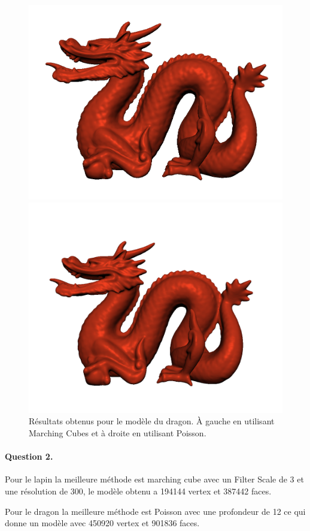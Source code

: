 \documentclass[french]{article}
\begin{document}
\begin{figure}[h]
	\centering
	\begin{minipage}{0.47\linewidth}
		\centering
		\includegraphics[width=\linewidth]{dragonrimls00.png}
	\end{minipage}\hfill
	\begin{minipage}{0.47\linewidth}
		\centering
		\includegraphics[width=\linewidth]{dragonpoisson00.png}
	\end{minipage}
	\caption{Résultats obtenus pour le modèle du dragon. À gauche en utilisant Marching Cubes et à droite en utilisant Poisson.}
	\label{fig:meshdragon}
\end{figure}

\paragraph{Question 2.}
Pour le lapin la  meilleure méthode est marching cube avec un Filter Scale de 3 et une résolution de 300, le modèle obtenu a 194144 vertex et  387442 faces.

Pour le dragon la meilleure méthode est Poisson avec une profondeur de 12 ce qui donne un modèle avec 450920 vertex et 901836 faces.
\end{document}
